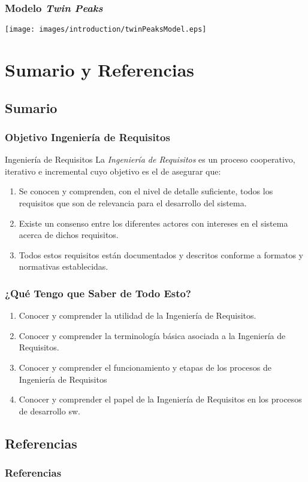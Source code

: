 \documentclass[a4paper,slidestop,xcolor=pst,dvips,blue]{beamer}
\begin{document}
\begin{frame}
    \frametitle{Modelo \emph{Twin Peaks}}
    \begin{center}
		\texttt{[image: images/introduction/twinPeaksModel.eps]}
    \end{center}
\end{frame}

\section{Sumario y Referencias}

\subsection{Sumario}

\begin{frame}
    \frametitle{Objetivo Ingeniería de Requisitos}
    \begin{block}{Ingeniería de Requisitos}
        La \alert{\emph{Ingeniería de Requisitos}} es un proceso cooperativo, iterativo e incremental cuyo objetivo es el de asegurar que:
        \begin{enumerate}
            \item<2-> Se conocen y comprenden, con el nivel de detalle suficiente, todos los requisitos que son de relevancia para el desarrollo del sistema.
            \item<3-> Existe un consenso entre los diferentes actores con intereses en el sistema acerca de dichos requisitos.
            \item<4-> Todos estos requisitos están documentados y descritos conforme a formatos y normativas establecidas.
        \end{enumerate}
    \end{block}
\end{frame}

\begin{frame}
    \frametitle{¿Qué Tengo que Saber de Todo Esto?}
    \begin{enumerate}[<+->]
        \item Conocer y comprender la utilidad de la Ingeniería de Requisitos.
        \item Conocer y comprender la terminología básica asociada a la Ingeniería de Requisitos.
        \item Conocer y comprender el funcionamiento y etapas de los procesos de Ingeniería de Requisitos
        \item Conocer y comprender el papel de la Ingeniería de Requisitos en los procesos de desarrollo sw.
    \end{enumerate}
\end{frame}

\subsection{Referencias}

\begin{frame}[allowframebreaks]
	\frametitle{Referencias}
	
	
\end{frame}
\end{document}
